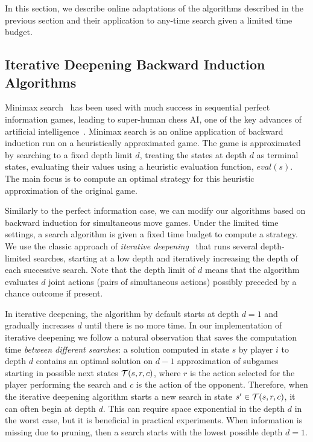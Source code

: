 
In this section, we describe online adaptations of the algorithms described in the previous section and their application
to any-time search given a limited time budget.

\subsection{Iterative Deepening Backward Induction Algorithms} \label{sec:idbi}

Minimax search~\cite{AIbook} has been used with much success in sequential perfect information games,
leading to super-human chess AI, one of the key advances of artificial
intelligence~\cite{Campbell02deepblue}.
Minimax search is an online application of backward induction run on a heuristically approximated game.
The game is approximated by searching to a fixed depth limit $d$, treating the states at depth $d$
as terminal states, evaluating their values using a heuristic evaluation function, $eval(s)$.
The main focus is to compute an optimal strategy for this heuristic approximation of the original game.

Similarly to the perfect information case, we can modify our algorithms based on backward induction for simultaneous move games.
Under the limited time settings, a search algorithm is given a fixed time budget to compute a strategy.
We use the classic approach of {\it iterative deepening}~\cite{AIbook} that runs several depth-limited
searches, starting at a low depth and iteratively increasing the depth of each successive search.
Note that the depth limit of $d$ means that the algorithm evaluates $d$ joint actions (\ie pairs of simultaneous actions) possibly preceded by a chance outcome if present.

In iterative deepening, the algorithm by default starts at depth $d = 1$ and gradually increases $d$ until there is no more time.
In our implementation of iterative deepening we follow a natural observation that saves the computation time {\it between different searches}: 
a solution computed in state $s$ by player $i$ to depth $d$ contains an optimal solution on $d-1$ approximation of subgames starting in possible next states $\mathcal{T}(s,r,c)$, where $r$ is the action selected for the player performing the search and $c$ is the action of the opponent.
Therefore, when the iterative deepening algorithm starts a new search in state $s' \in \mathcal{T}(s,r,c)$, it can often begin at depth $d$.
This can require space exponential in the depth $d$ in the worst case, but it is beneficial in practical experiments.
When information is missing due to pruning, then a search starts with the lowest possible depth $d = 1$.

